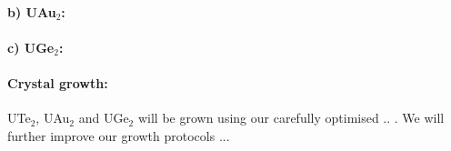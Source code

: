   
  \paragraph{b) UAu$_2$:}
  
  \paragraph{c) UGe$_2$:}
  
  
  
\paragraph{Crystal growth:} UTe$_2$, UAu$_2$ and UGe$_2$ will be grown using our carefully optimised .. .   We will further improve our growth protocols ... 

